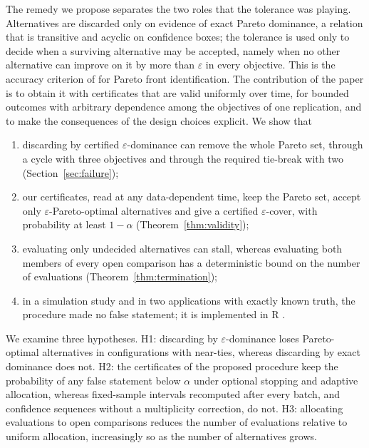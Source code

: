 The remedy we propose separates the two roles that the tolerance was playing. Alternatives are discarded only on evidence of exact Pareto dominance, a relation that is transitive and acyclic on confidence boxes; the tolerance is used only to decide when a surviving alternative may be accepted, namely when no other alternative can improve on it by more than $\varepsilon$ in every objective. This is the accuracy criterion of \citet{auer2016} for Pareto front identification. The contribution of the paper is to obtain it with certificates that are valid uniformly over time, for bounded outcomes with arbitrary dependence among the objectives of one replication, and to make the consequences of the design choices explicit. We show that
\begin{enumerate}[leftmargin=*,itemsep=0pt]
\item discarding by certified $\varepsilon$-dominance can remove the whole Pareto set, through a cycle with three objectives and through the required tie-break with two (Section~\ref{sec:failure});
\item our certificates, read at any data-dependent time, keep the Pareto set, accept only $\varepsilon$-Pareto-optimal alternatives and give a certified $\varepsilon$-cover, with probability at least $1-\alpha$ (Theorem~\ref{thm:validity});
\item evaluating only undecided alternatives can stall, whereas evaluating both members of every open comparison has a deterministic bound on the number of evaluations (Theorem~\ref{thm:termination});
\item in a simulation study and in two applications with exactly known truth, the procedure made no false statement; it is implemented in R \citep{paretoinfer}.
\end{enumerate}

We examine three hypotheses. H1: discarding by $\varepsilon$-dominance loses Pareto-optimal alternatives in configurations with near-ties, whereas discarding by exact dominance does not. H2: the certificates of the proposed procedure keep the probability of any false statement below $\alpha$ under optional stopping and adaptive allocation, whereas fixed-sample intervals recomputed after every batch, and confidence sequences without a multiplicity correction, do not. H3: allocating evaluations to open comparisons reduces the number of evaluations relative to uniform allocation, increasingly so as the number of alternatives grows.

